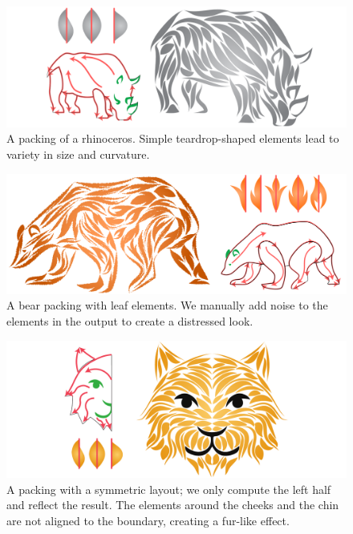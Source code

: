 \begin{figure}
\centering
\includegraphics[width=1.0\textwidth]{figures/flowpak/result_02.pdf} %
\caption[A packing of a rhinoceros]
{\label{result_rhino}
A packing of a rhinoceros.  Simple teardrop-shaped 
elements lead to variety in size and curvature.}
\end{figure}
\begin{figure}
\includegraphics[width=1.0\textwidth]{figures/flowpak/bear_leaves.pdf} %
\caption[A packing of a bear with leaf elements]
{\label{result_bear_leaves}
  A bear packing with leaf elements.  We manually add noise to the 
  elements in the output to create a distressed look.}
\end{figure}

\begin{figure}
\centering
\includegraphics[width=1.0\textwidth]{figures/flowpak/cat.pdf}
\caption[A packing of a cat]
{A packing with a symmetric layout; we only compute the left half and reflect the result. The elements around the cheeks and the chin are not aligned to the boundary, creating a fur-like effect.}
\label{result_cat}
\end{figure}


